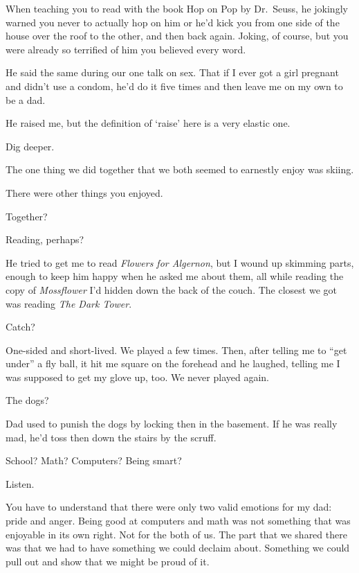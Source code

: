 \begin{paracol}{2}
\begin{leftcolumn}
\begin{ally}
When teaching you to read with the book Hop on Pop by Dr.~Seuss, he jokingly warned you never to actually hop on him or he'd kick you from one side of the house over the roof to the other, and then back again. Joking, of course, but you were already so terrified of him you believed every word.
\end{ally}
He said the same during our one talk on sex. That if I ever got a girl pregnant and didn't use a condom, he'd do it five times and then leave me on my own to be a dad.

He raised me, but the definition of `raise' here is a very elastic one.

\begin{ally}
Dig deeper.
\end{ally}
\newpage

The one thing we did together that we both seemed to earnestly enjoy was skiing.

\begin{ally}
There were other things you enjoyed.
\end{ally}
Together?

\begin{ally}
Reading, perhaps?
\end{ally}
He tried to get me to read \emph{Flowers for Algernon}, but I wound up skimming parts, enough to keep him happy when he asked me about them, all while reading the copy of \emph{Mossflower} I'd hidden down the back of the couch. The closest we got was reading \emph{The Dark Tower}.

\begin{ally}
Catch?
\end{ally}
One-sided and short-lived. We played a few times. Then, after telling me to ``get under'' a fly ball, it hit me square on the forehead and he laughed, telling me I was supposed to get my glove up, too. We never played again.

\begin{ally}
The dogs?
\end{ally}
Dad used to punish the dogs by locking then in the basement. If he was really mad, he'd toss then down the stairs by the scruff.

\begin{ally}
School? Math? Computers? Being smart?
\end{ally}
Listen.

You have to understand that there were only two valid emotions for my dad: pride and anger. Being good at computers and math was not something that was enjoyable in its own right. Not for the both of us. The part that we shared there was that we had to have something we could declaim about. Something we could pull out and show that we might be proud of it.


\end{leftcolumn}
\end{paracol}
